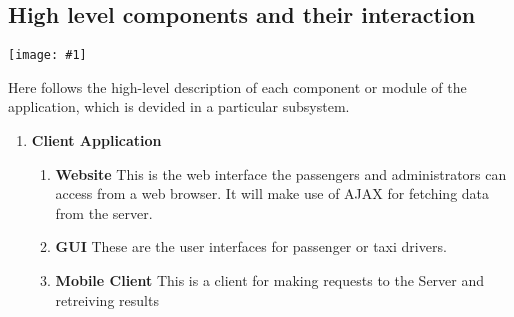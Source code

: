 \documentclass[11pt, a4paper,titlepage]{article}
\newcommand{\image}[1]{
	\begin{center}
		\noindent \texttt{[image: \#1]}
	\end{center}
	}
\begin{document}
\subsection{High level components and their interaction}
\image{diagram_components_hilevel.png}
\newpage
 Here follows the high-level description of each component or module of the application, which is devided in a particular subsystem.
 \begin{enumerate}
 	\item \textbf{Client Application}
 	 \begin{enumerate}
 	 	\item \label{itm:Component_Browser} \textbf{Website} This is the web interface the passengers and administrators can access from a web browser. It will make use of AJAX for fetching data from the server.
 	 	\item \label{itm:Component_ClientApplication} \textbf{GUI} These are the user interfaces for passenger or taxi drivers.
		\item \label{itm:Component_MobileClient} \textbf{Mobile Client} This is a client for making requests to the Server and retreiving results
		

\end{enumerate}
\end{enumerate}
\end{document}
